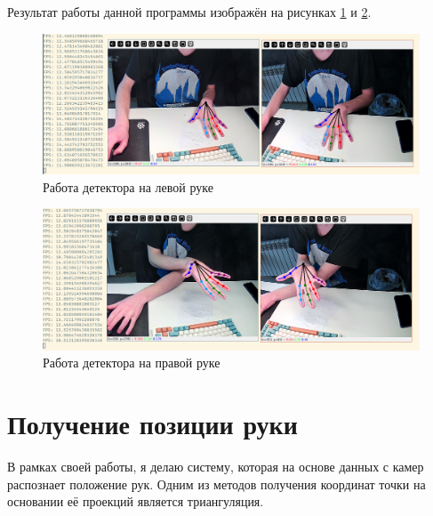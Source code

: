 \documentclass[14pt, a4paper]{extarticle}
\begin{document}
Результат работы данной программы изображён на рисунках \ref{fig:run-detection-screenshots-1} и \ref{fig:run-detection-screenshots-2}.
\begin{figure}[!hp]
  \includegraphics[width=\linewidth]{images/run-detection-screenshots/run-detection-1.png}
  \caption{Работа детектора на левой руке}\label{fig:run-detection-screenshots-1}
\end{figure}
\begin{figure}[!hp]
  \includegraphics[width=\linewidth]{images/run-detection-screenshots/run-detection-2.png}
  \caption{Работа детектора на правой руке}\label{fig:run-detection-screenshots-2}
\end{figure}

\section{Получение позиции руки}
В рамках своей работы, я делаю систему, которая на основе данных с камер
распознает положение рук. Одним из методов получения координат точки на
основании её проекций является триангуляция. 
\end{document}
